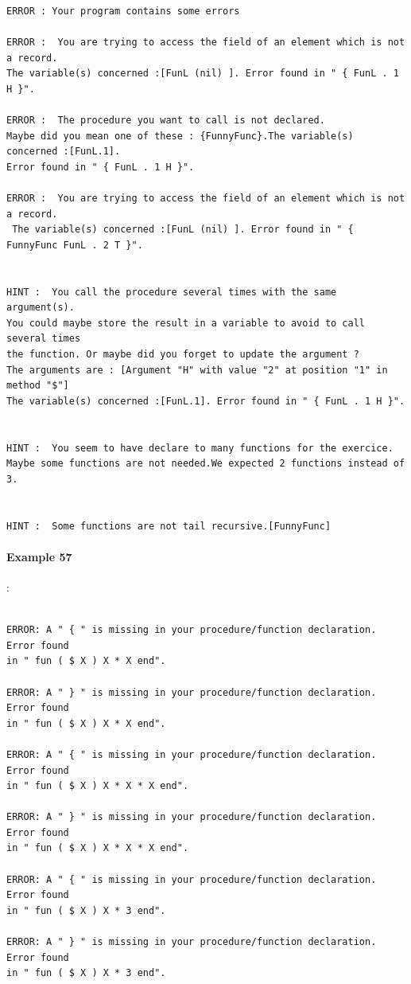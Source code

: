 \documentclass[11pt,a4paper,twoside,openright]{report}
\begin{document}
\begin{lstlisting}
ERROR : Your program contains some errors

ERROR :  You are trying to access the field of an element which is not a record.   
The variable(s) concerned :[FunL (nil) ]. Error found in " { FunL . 1 H }".

ERROR :  The procedure you want to call is not declared. 
Maybe did you mean one of these : {FunnyFunc}.The variable(s) concerned :[FunL.1]. 
Error found in " { FunL . 1 H }".

ERROR :  You are trying to access the field of an element which is not a record.  
 The variable(s) concerned :[FunL (nil) ]. Error found in " { FunnyFunc FunL . 2 T }".


HINT :  You call the procedure several times with the same argument(s). 
You could maybe store the result in a variable to avoid to call several times 
the function. Or maybe did you forget to update the argument ? 
The arguments are : [Argument "H" with value "2" at position "1" in method "$"]
The variable(s) concerned :[FunL.1]. Error found in " { FunL . 1 H }".


HINT :  You seem to have declare to many functions for the exercice. 
Maybe some functions are not needed.We expected 2 functions instead of 3.


HINT :  Some functions are not tail recursive.[FunnyFunc]

\end{lstlisting}

\paragraph{Example 57}:


\begin{lstlisting}

ERROR: A " { " is missing in your procedure/function declaration. Error found 
in " fun ( $ X ) X * X end".

ERROR: A " } " is missing in your procedure/function declaration. Error found 
in " fun ( $ X ) X * X end".

ERROR: A " { " is missing in your procedure/function declaration. Error found 
in " fun ( $ X ) X * X * X end".

ERROR: A " } " is missing in your procedure/function declaration. Error found 
in " fun ( $ X ) X * X * X end".

ERROR: A " { " is missing in your procedure/function declaration. Error found 
in " fun ( $ X ) X * 3 end".

ERROR: A " } " is missing in your procedure/function declaration. Error found 
in " fun ( $ X ) X * 3 end".
\end{lstlisting}
\end{document}
